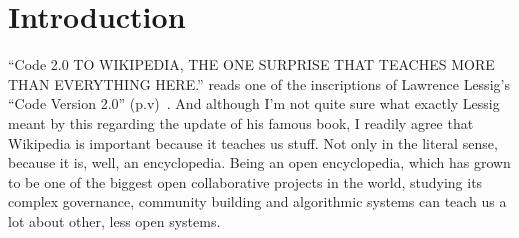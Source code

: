 %
\chapter{Introduction}
\label{chap:introduction}

\begin{comment}
Another candidate for an opening quote:
\cite{Geiger2014}
"Bots aren’t usually part of some master plan – if they were, they probably wouldn’t be bots."
-- Wikipedia is a system run by volunteers which has grown organically. Stuff is often implemented the way it is because somebody was good at this particular technology and felt like doing it at the precise moment.

\cite{Charmaz2006}
"At each phase of the research journey, \textit{your} reasings of your work guide your next moves."(p.xi)
"In short, the finished work is a construction–yours." (p.xi)
\end{comment}

\begin{comment}
- algorithmic governance
- code is law
\end{comment}

``Code 2.0 TO WIKIPEDIA, THE ONE SURPRISE THAT TEACHES MORE THAN EVERYTHING HERE.'' reads one of the inscriptions of Lawrence Lessig's ``Code Version 2.0'' (p.v)~\cite{Lessig2006}.
And although I'm not quite sure what exactly Lessig meant by this regarding the update of his famous book, I readily agree that Wikipedia is important because it teaches us stuff.
Not only in the literal sense, because it is, well, an encyclopedia.
Being an open encyclopedia, which has grown to be one of the biggest open collaborative projects in the world, studying its complex governance, community building and algorithmic systems can teach us a lot about other, less open systems.

